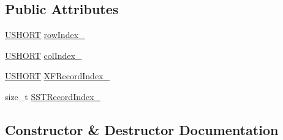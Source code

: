 \subsection*{Public Attributes}
\begin{DoxyCompactItemize}
\item 
\hyperlink{_basic_excel_8hpp_a5850d5316caf7f4cedd742fdf8cd7c02}{U\+S\+H\+O\+R\+T} \hyperlink{struct_y_excel_1_1_worksheet_1_1_cell_table_1_1_row_block_1_1_cell_block_1_1_label_s_s_t_a070a644239d53ed39bbf231ecf16f265}{row\+Index\+\_\+}
\item 
\hyperlink{_basic_excel_8hpp_a5850d5316caf7f4cedd742fdf8cd7c02}{U\+S\+H\+O\+R\+T} \hyperlink{struct_y_excel_1_1_worksheet_1_1_cell_table_1_1_row_block_1_1_cell_block_1_1_label_s_s_t_aee840cd1aa64e5a3ca3f2035a5d9b5dd}{col\+Index\+\_\+}
\item 
\hyperlink{_basic_excel_8hpp_a5850d5316caf7f4cedd742fdf8cd7c02}{U\+S\+H\+O\+R\+T} \hyperlink{struct_y_excel_1_1_worksheet_1_1_cell_table_1_1_row_block_1_1_cell_block_1_1_label_s_s_t_a7f007d0cdd0b983521f59572bc5bf49a}{X\+F\+Record\+Index\+\_\+}
\item 
size\+\_\+t \hyperlink{struct_y_excel_1_1_worksheet_1_1_cell_table_1_1_row_block_1_1_cell_block_1_1_label_s_s_t_a4d0c8a6fc601c69d5686a4538bb31327}{S\+S\+T\+Record\+Index\+\_\+}
\end{DoxyCompactItemize}


\subsection{Constructor \& Destructor Documentation}
\hypertarget{struct_y_excel_1_1_worksheet_1_1_cell_table_1_1_row_block_1_1_cell_block_1_1_label_s_s_t_aa2cbcce5e3fa0353b2a792fc303804ae}{}
